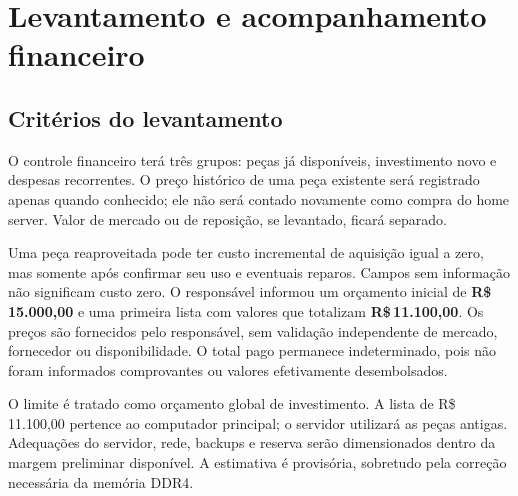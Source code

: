 \documentclass[11pt,a4paper,oneside]{report}
\newcommand{\dinheiro}[1]{R\$\,#1}
\begin{document}
\chapter{Levantamento e acompanhamento financeiro}
\section{Critérios do levantamento}
O controle financeiro terá três grupos: peças já disponíveis, investimento
novo e despesas recorrentes. O preço histórico de uma peça existente será
registrado apenas quando conhecido; ele não será contado novamente como compra
do home server. Valor de mercado ou de reposição, se levantado, ficará separado.

Uma peça reaproveitada pode ter custo incremental de aquisição igual a zero,
mas somente após confirmar seu uso e eventuais reparos. Campos sem informação
não significam custo zero. O responsável informou um orçamento inicial de
\textbf{\dinheiro{15.000,00}} e uma primeira lista com valores que totalizam
\textbf{\dinheiro{11.100,00}}. Os preços são fornecidos pelo responsável,
sem validação independente de mercado, fornecedor ou disponibilidade.
O total pago permanece indeterminado, pois não foram informados comprovantes
ou valores efetivamente desembolsados.

O limite é tratado como orçamento global de investimento. A lista de
\dinheiro{11.100,00} pertence ao computador principal; o servidor utilizará
as peças antigas. Adequações do servidor, rede, backups e reserva serão
dimensionados dentro da margem preliminar disponível.
A estimativa é provisória, sobretudo pela correção necessária da memória DDR4.
\end{document}
